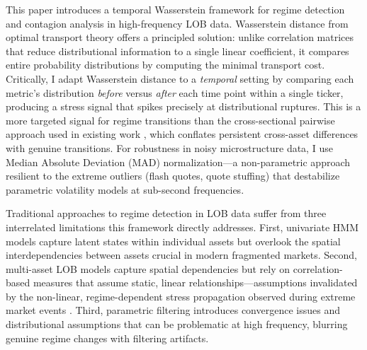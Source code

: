 \documentclass{article}
\begin{document}
This paper introduces a temporal Wasserstein framework for regime detection and
contagion analysis in high-frequency LOB data. Wasserstein distance from
optimal transport theory offers a principled solution: unlike correlation
matrices that reduce distributional information to a single linear coefficient,
it compares entire probability distributions by computing the minimal transport
cost. Critically, I adapt Wasserstein distance to a \textit{temporal} setting
by comparing each metric's distribution \textit{before} versus \textit{after}
each time point within a single ticker, producing a stress signal that spikes
precisely at distributional ruptures. This is a more targeted signal for regime
transitions than the cross-sectional pairwise approach used in existing work
\parencite{horvath2021clustering}, which conflates persistent cross-asset
differences with genuine transitions. For robustness in noisy microstructure
data, I use Median Absolute Deviation (MAD) normalization---a non-parametric
approach resilient to the extreme outliers (flash quotes, quote stuffing) that
destabilize parametric volatility models at sub-second frequencies.

Traditional approaches to regime detection in LOB data suffer from three
interrelated limitations this framework directly addresses. First, univariate
HMM models \parencite{slupinski2020hidden, wisebourt2011hierarchical, kth2017online}
capture latent states within individual assets but overlook the spatial
interdependencies between assets crucial in modern fragmented markets. Second,
multi-asset LOB models \parencite{kercheval2024attention, zhou2025tlob} capture
spatial dependencies but rely on correlation-based measures that assume static,
linear relationships---assumptions invalidated by the non-linear,
regime-dependent stress propagation observed during extreme market events
\parencite{cont2014price}. Third, parametric filtering introduces convergence issues
and distributional assumptions that can be problematic at high frequency,
blurring genuine regime changes with filtering artifacts.
\end{document}
